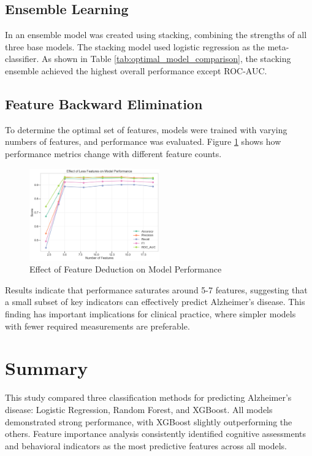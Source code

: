 \documentclass[12pt]{article}
\begin{document}
\subsection{Ensemble Learning}
In \cite{hastie01statisticallearning} an ensemble model was created using stacking, combining the strengths of all three base models. The stacking model used logistic regression as the meta-classifier. As shown in Table \ref{tab:optimal_model_comparison}, the stacking ensemble achieved the highest overall performance except ROC-AUC.

\subsection{Feature Backward Elimination}
To determine the optimal set of features, models were trained with varying numbers of features, and performance was evaluated. Figure \ref{fig:feature_count} shows how performance metrics change with different feature counts.

\begin{figure}
    \centering
    \includegraphics[width=0.5\textwidth]{figures/effect_less_features.png}
    \caption{Effect of Feature Deduction on Model Performance}
    \label{fig:feature_count}
\end{figure}

Results indicate that performance saturates around 5-7 features, suggesting that a small subset of key indicators can effectively predict Alzheimer's disease. This finding has important implications for clinical practice, where simpler models with fewer required measurements are preferable.

\section{Summary}
\label{sec:summary}

This study compared three classification methods for predicting Alzheimer's disease: Logistic Regression, Random Forest, and XGBoost. All models demonstrated strong performance, with XGBoost slightly outperforming the others. Feature importance analysis consistently identified cognitive assessments and behavioral indicators as the most predictive features across all models.
\end{document}
